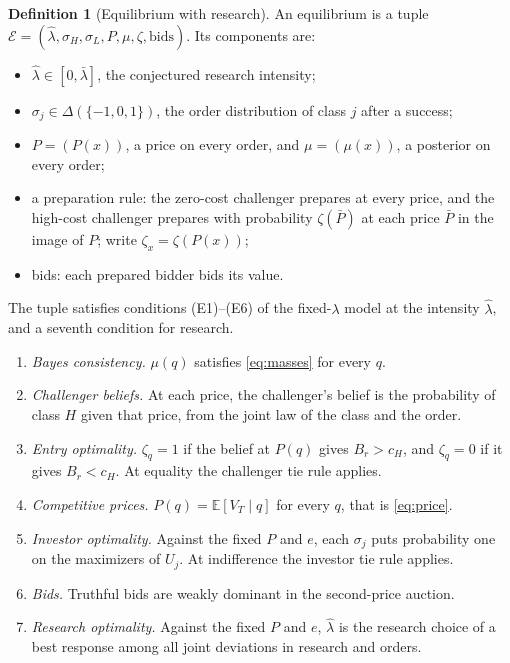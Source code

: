 \documentclass[12pt]{article}
\theoremstyle{definition}
\newtheorem{definition}{Definition}
\theoremstyle{remark}
\newcommand{\E}{\mathbb E}
\newcommand{\lh}{\hat\lambda}
\newcommand{\lb}{\bar\lambda}
\begin{document}
\begin{definition}[Equilibrium with research]\label{def:eq}
An equilibrium is a tuple $\mathcal E=(\lh,\sigma_H,\sigma_L,P,\mu,\zeta,\text{bids})$. Its components are:
\begin{itemize}[nosep]
\item $\lh\in[0,\lb]$, the conjectured research intensity;
\item $\sigma_j\in\Delta(\{-1,0,1\})$, the order distribution of class $j$ after a success;
\item $P=(P(x))$, a price on every order, and $\mu=(\mu(x))$, a posterior on every order;
\item a preparation rule: the zero-cost challenger prepares at every price, and the high-cost challenger prepares
  with probability $\zeta(\bar P)$ at each price $\bar P$ in the image of $P$; write $\zeta_x=\zeta(P(x))$;
\item bids: each prepared bidder bids its value.
\end{itemize}
The tuple satisfies conditions (E1)--(E6) of the fixed-$\lambda$ model at the intensity $\lh$, and a seventh
condition for research.
\begin{enumerate}[label=(E\arabic*),nosep]
\item \emph{Bayes consistency.} $\mu(q)$ satisfies \eqref{eq:masses} for every $q$.
\item \emph{Challenger beliefs.} At each price, the challenger's belief is the probability of class $H$ given
  that price, from the joint law of the class and the order.
\item \emph{Entry optimality.} $\zeta_q=1$ if the belief at $P(q)$ gives $B_r>c_H$, and $\zeta_q=0$ if it gives
  $B_r<c_H$. At equality the challenger tie rule applies.
\item \emph{Competitive prices.} $P(q)=\E[V_T\mid q]$ for every $q$, that is \eqref{eq:price}.
\item \emph{Investor optimality.} Against the fixed $P$ and $e$, each $\sigma_j$ puts probability one on the
  maximizers of $U_j$. At indifference the investor tie rule applies.
\item \emph{Bids.} Truthful bids are weakly dominant in the second-price auction.
\item \emph{Research optimality.} Against the fixed $P$ and $e$, $\lh$ is the research choice of a best response
  among all joint deviations in research and orders.
\end{enumerate}
\end{definition}
\end{document}
